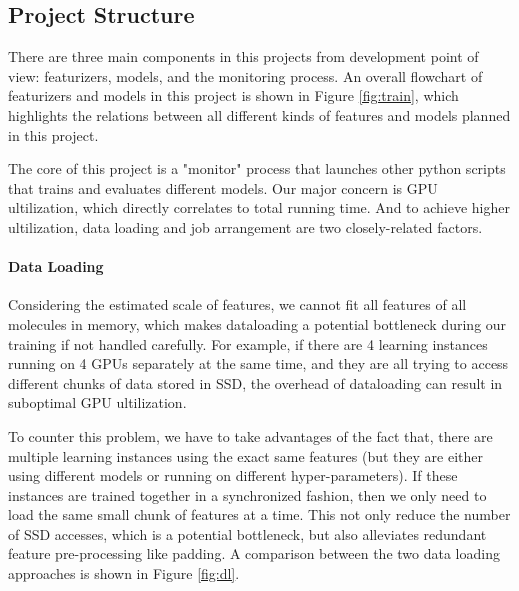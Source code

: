 \documentclass[conference]{IEEEtran}
\begin{document}
\subsection{Project Structure} \label{subsec_struct}

There are three main components in this projects from development point of view: featurizers, models, and the monitoring process. 
An overall flowchart of featurizers and models in this project is shown in Figure \ref{fig:train}, which highlights the relations between all different kinds of features and models planned in this project. 

The core of this project is a "monitor" process that launches other python scripts that trains and evaluates different models. 
Our major concern is GPU ultilization, which directly correlates to total running time. 
And to achieve higher ultilization, data loading and job arrangement are two closely-related factors. 

\paragraph{Data Loading} 

Considering the estimated scale of features, we cannot fit all features of all molecules in memory, which makes dataloading a potential bottleneck during our training if not handled carefully. 
For example, if there are 4 learning instances running on 4 GPUs separately at the same time, and they are all trying to access different chunks of data stored in SSD, the overhead of dataloading can result in suboptimal GPU ultilization. 

To counter this problem, we have to take advantages of the fact that, there are multiple learning instances using the exact same features (but they are either using different models or running on different hyper-parameters). 
If these instances are trained together in a synchronized fashion, then we only need to load the same small chunk of features at a time. 
This not only reduce the number of SSD accesses, which is a potential bottleneck, but also alleviates redundant feature pre-processing like padding. 
A comparison between the two data loading approaches is shown in Figure \ref{fig:dl}.
\end{document}
